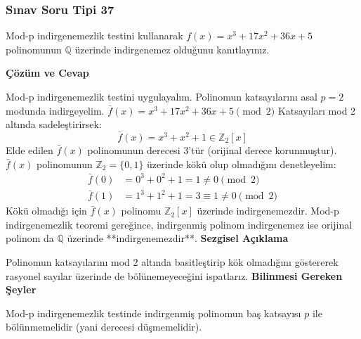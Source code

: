 \documentclass[11pt, a4paper]{article}
\newenvironment{cozum}{
    \vspace{0.5cm}
    \noindent\textcolor{green!60!black}{\faCheckCircle\enspace \textbf{\Large Çözüm ve Cevap}}\par\vspace{0.2cm}
}{}
\newenvironment{sezgisel}{
    \vspace{0.5cm}
    \noindent\textcolor{orange!80!black}{\faLightbulb\enspace \textbf{\Large Sezgisel Açıklama}}\par\vspace{0.2cm}
    \itshape
}{}
\newenvironment{bilgi}{
    \vspace{0.5cm}
    \noindent\textcolor{red!70!black}{\faExclamationTriangle\enspace \textbf{\Large Bilinmesi Gereken Şeyler}}\par\vspace{0.2cm}
}{}
\begin{document}
\subsubsection{Sınav Soru Tipi 37}
\begin{sinavbox}
Mod-p indirgenemezlik testini kullanarak $f(x) = x^3+17x^2+36x+5$ polinomunun $\mathbb{Q}$ üzerinde indirgenemez olduğunu kanıtlayınız.
\end{sinavbox}
\begin{cozum}
Mod-p indirgenemezlik testini uygulayalım. Polinomun katsayılarını asal $p=2$ modunda indirgeyelim.
$\bar{f}(x) = x^3 + 17x^2 + 36x + 5 \pmod 2$
Katsayıları mod 2 altında sadeleştirirsek:
\[ \bar{f}(x) = x^3 + x^2 + 1 \in \mathbb{Z}_2[x] \]
Elde edilen $\bar{f}(x)$ polinomunun derecesi 3'tür (orijinal derece korunmuştur).
$\bar{f}(x)$ polinomunun $\mathbb{Z}_2 = \{0, 1\}$ üzerinde kökü olup olmadığını denetleyelim:
\begin{align*}
\bar{f}(0) &= 0^3+0^2+1 = 1 \neq 0 \pmod 2 \\
\bar{f}(1) &= 1^3+1^2+1 = 3 \equiv 1 \neq 0 \pmod 2
\end{align*}
Kökü olmadığı için $\bar{f}(x)$ polinomu $\mathbb{Z}_2[x]$ üzerinde indirgenemezdir.
Mod-p indirgenemezlik teoremi gereğince, indirgenmiş polinom indirgenemez ise orijinal polinom da $\mathbb{Q}$ üzerinde **indirgenemezdir**.
\end{cozum}
\begin{sezgisel}
Polinomun katsayılarını mod 2 altında basitleştirip kök olmadığını göstererek rasyonel sayılar üzerinde de bölünemeyeceğini ispatlarız.
\end{sezgisel}
\begin{bilgi}
Mod-p indirgenemezlik testinde indirgenmiş polinomun baş katsayısı $p$ ile bölünmemelidir (yani derecesi düşmemelidir).
\end{bilgi}

\newpage
\end{document}
